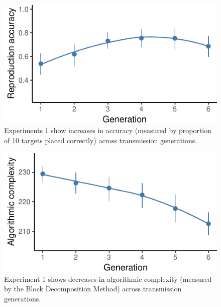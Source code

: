 \documentclass[10pt, letterpaper]{article}
\newenvironment{CodeChunk}{}{}
\begin{document}
\begin{CodeChunk}
\begin{figure}[tb]

{\centering \includegraphics{figs/e1_acc_plot-1} 

}

\caption[Experiments 1 show increases in accuracy (measured by proportion of 10 targets placed correctly) across transmission generations]{Experiments 1 show increases in accuracy (measured by proportion of 10 targets placed correctly) across transmission generations.}\label{fig:e1_acc_plot}
\end{figure}
\end{CodeChunk}

\begin{CodeChunk}
\begin{figure}[tb]

{\centering \includegraphics{figs/e1_bdm_plot-1} 

}

\caption[Experiment 1 shows decreases in algorithmic complexity (measured by the Block Decomposition Method) across transmission generations]{Experiment 1 shows decreases in algorithmic complexity (measured by the Block Decomposition Method) across transmission generations.}\label{fig:e1_bdm_plot}
\end{figure}
\end{CodeChunk}
\end{document}
